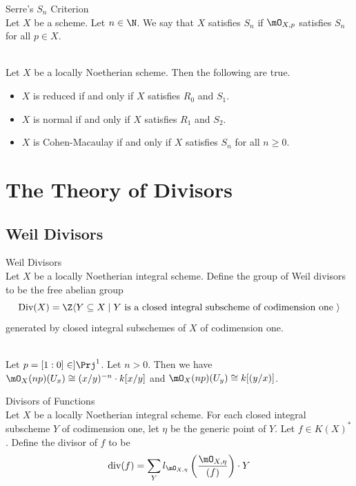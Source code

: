 \documentclass[a4paper]{article}
\begin{document}
\begin{defn}{Serre's $S_n$ Criterion}{}\\
Let $X$ be a scheme. Let $n\in\N$. We say that $X$ satisfies $S_n$ if $\mO_{X,p}$ satisfies $S_n$ for all $p\in X$. 
\end{defn}

\begin{prp}{}{}\\
Let $X$ be a locally Noetherian scheme. Then the following are true. 
\begin{itemize}
\item $X$ is reduced if and only if $X$ satisfies $R_0$ and $S_1$. 
\item $X$ is normal if and only if $X$ satisfies $R_1$ and $S_2$. 
\item $X$ is Cohen-Macaulay if and only if $X$ satisfies $S_n$ for all $n\geq 0$. 
\end{itemize}
\end{prp}

\pagebreak
\section{The Theory of Divisors}
\subsection{Weil Divisors}
\begin{defn}{Weil Divisors}{}\\
Let $X$ be a locally Noetherian integral scheme. Define the group of Weil divisors to be the free abelian group $$\text{Div}(X)=\Z\langle Y\subseteq X\;|\;Y\text{ is a closed integral subscheme of codimension one }\rangle$$ generated by closed integral subschemes of $X$ of codimension one. 
\end{defn}

\begin{eg}{}{}\\
Let $p=[1:0]\in]\Prj^1$. Let $n>0$. Then we have $\mO_X(np)(U_x)\cong (x/y)^{-n}\cdot k[x/y]$ and $\mO_X(np)(U_y)\cong k[(y/x)]$. 
\end{eg}

\begin{defn}{Divisors of Functions}{}\\
Let $X$ be a locally Noetherian integral scheme. For each closed integral subscheme $Y$ of codimension one, let $\eta$ be the generic point of $Y$. Let $f\in K(X)^\ast$. Define the divisor of $f$ to be $$\text{div}(f)=\sum_Yl_{\mO_{X,\eta}}\left(\frac{\mO_{X,\eta}}{(f)}\right)\cdot Y$$
\end{defn}
\end{document}
